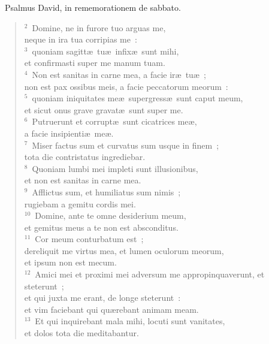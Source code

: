 ~\lettrine[lines=10,image=true,loversize=0.05,lraise=-0.03]{P}{}salmus David, in rememorationem de sabbato.
\begin{flushleft}\begin{verse}\vspace{6pt}${}^{2}$~Domine, ne in furore tuo arguas me,\\ neque in ira tua corripias me~:\\
${}^{3}$~quoniam sagitt\ae\ tu\ae\ infix\ae\ sunt mihi,\\ et confirmasti super me manum tuam.\\
${}^{4}$~Non est sanitas in carne mea, a facie ir\ae\ tu\ae~;\\ non est pax ossibus meis, a facie peccatorum meorum~:\\
${}^{5}$~quoniam iniquitates me\ae\ supergress\ae\ sunt caput meum,\\ et sicut onus grave gravat\ae\ sunt super me.\\
${}^{6}$~Putruerunt et corrupt\ae\ sunt cicatrices me\ae ,\\ a facie insipienti\ae\ me\ae .\\
${}^{7}$~Miser factus sum et curvatus sum usque in finem~;\\ tota die contristatus ingrediebar.\\
${}^{8}$~Quoniam lumbi mei impleti sunt illusionibus,\\ et non est sanitas in carne mea.\\
${}^{9}$~Afflictus sum, et humiliatus sum nimis~;\\ rugiebam a gemitu cordis mei.\\
${}^{10}$~Domine, ante te omne desiderium meum,\\ et gemitus meus a te non est absconditus.\\
${}^{11}$~Cor meum conturbatum est~;\\ dereliquit me virtus mea, et lumen oculorum meorum,\\ et ipsum non est mecum.\\
${}^{12}$~Amici mei et proximi mei adversum me appropinquaverunt, et steterunt~;\\ et qui juxta me erant, de longe steterunt~:\\ et vim faciebant qui qu\ae rebant animam meam.\\
${}^{13}$~Et qui inquirebant mala mihi, locuti sunt vanitates,\\ et dolos tota die meditabantur.\\

\end{verse}
\end{flushleft}
